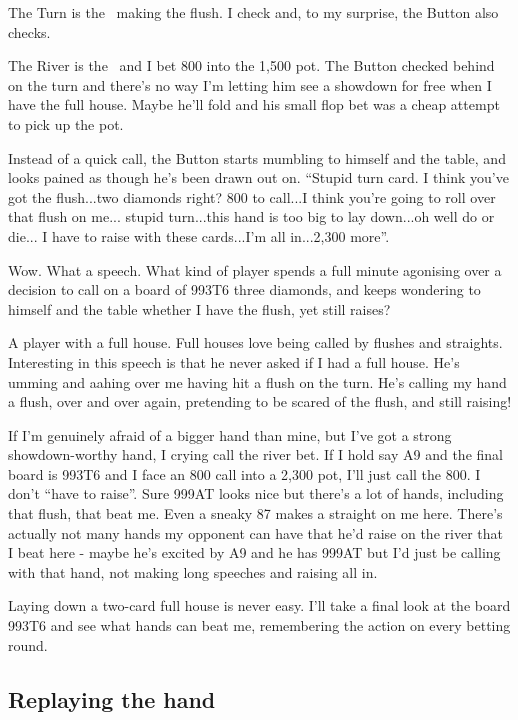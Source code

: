 The Turn is the \tend\, making the flush. I check and, to my
surprise, the Button also checks.

The River is the \sixs\ and I bet 800 into the 1,500 pot. The Button
checked behind on the turn and there's no way I'm letting him
see a showdown for free when I have the full house. Maybe he'll fold
and his small flop bet was a cheap attempt to pick up the pot.

Instead of a quick call, the Button starts mumbling to himself and the
table, and looks pained as though he's been drawn out on.
``Stupid turn card. I think you've got the flush...two diamonds right?
800 to call...I think you're going to roll over that flush on me...
stupid turn...this hand is too big to lay down...oh well do or die...
I have to raise with these cards...I'm all in...2,300 more''.

Wow. What a speech. What kind of player spends a full minute agonising
over a decision to call on a board of 993T6 three diamonds, and keeps
wondering to himself and the table whether I have the flush, yet still
raises?

A player with a full house. Full houses love being called by flushes
and straights. Interesting in this speech is that he never asked
if I had a full house. He's umming and aahing over me having
hit a flush on the turn. He's calling my hand a flush, over and over
again, pretending to be scared of the flush, and still raising!

If I'm genuinely afraid of a bigger hand than mine, but I've
got a strong showdown-worthy hand, I crying call the river bet.
If I hold say A9 and the final board is 993T6 and I face an 800 call into
a 2,300 pot, I'll just call the 800. I don't ``have to raise''. Sure
999AT looks nice but there's a lot of hands, including that flush,
that beat me. Even a sneaky 87 makes a straight on me here. There's
actually not many hands my opponent can have that he'd raise on the
river that I beat here - maybe he's excited by A9 and he has 999AT but
I'd just be calling with that hand,
not making long speeches and raising all in.

Laying down a two-card full house is never easy. I'll take a final look
at the board 993T6 and see what hands can beat me, remembering the
action on every betting round.

\subsection*{Replaying the hand}

